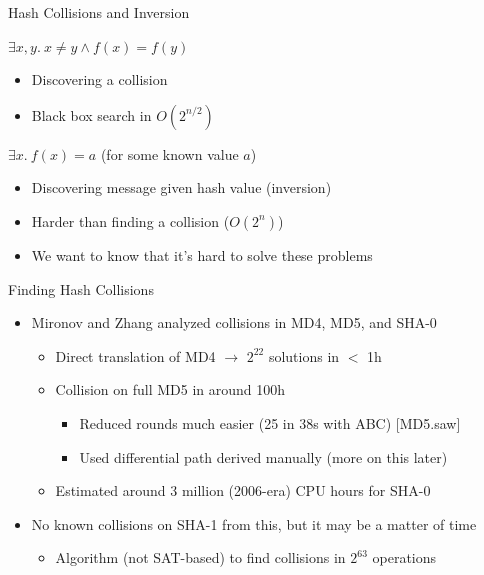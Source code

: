 \documentclass[ignorenonframetext,]{beamer}
\providecommand{\tightlist}{%
  \setlength{\itemsep}{0pt}\setlength{\parskip}{0pt}}
\newcommand{\infile}[1]{{\tiny \alert{[#1]}}}
\begin{document}
\begin{frame}{Hash Collisions and Inversion}

\begin{center}
$\exists x, y.~x \neq y \wedge f(x) = f(y)$
\end{center}

\begin{itemize}
\tightlist
\item
  Discovering a collision
\item
  Black box search in \(O(2^{n/2})\)
\end{itemize}

\begin{center}
$\exists x.~f(x) = a$ (for some known value $a$)
\end{center}

\begin{itemize}
\item
  Discovering message given hash value (inversion)
\item
  Harder than finding a collision (\(O(2^{n})\))
\item
  We want to know that it's \alert{hard} to solve these problems
\end{itemize}

\end{frame}

\begin{frame}{Finding Hash Collisions}

\begin{itemize}
\tightlist
\item Mironov and Zhang analyzed collisions in MD4, MD5, and SHA-0
  \cite{mironov2006hash}

  \begin{itemize}
  \tightlist
  \item
    Direct translation of MD4 \(\rightarrow\) \(2^{22}\) solutions in
    \(<\) 1h
  \item
    Collision on full MD5 in around 100h

    \begin{itemize}
    \tightlist
    \item
      Reduced rounds much easier (25 in 38s with ABC) \infile{MD5.saw}
    \item
      Used differential path derived manually (more on this later)
    \end{itemize}
  \item
    Estimated around 3 million (2006-era) CPU hours for SHA-0
  \end{itemize}
\item
  No known collisions on SHA-1 from this, but it may be a matter of time

  \begin{itemize}
  \tightlist
  \item
    Algorithm (not SAT-based) to find collisions in \(2^{63}\)
    operations
  \end{itemize}
\end{itemize}

\end{frame}
\end{document}
